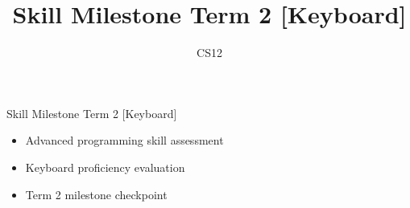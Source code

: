 \documentclass{beamer}
\title{Skill Milestone Term 2 [Keyboard]}
\author{CS12}
\date{}
\begin{document}
\begin{frame}
    \titlepage
\end{frame}

\begin{frame}{Skill Milestone Term 2 [Keyboard]}
    \begin{itemize}
        \item Advanced programming skill assessment
        \item Keyboard proficiency evaluation
        \item Term 2 milestone checkpoint
    \end{itemize}
\end{frame}
\end{document}
